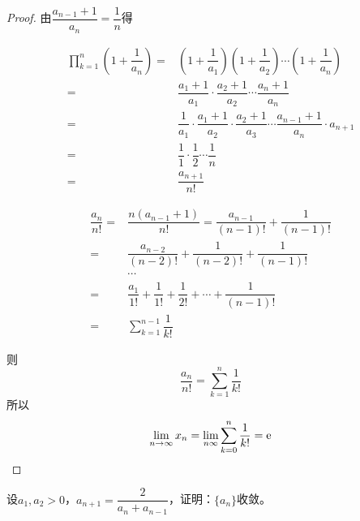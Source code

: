 \begin{proof}

    由$\dfrac{a_{n - 1} + 1}{a_n} = \dfrac{1}{n}$得

    \begin{align*}
        \prod_{k  = 1}^{n}{\left( 1 + \dfrac{1}{a_n} \right)} = & \left( 1 + \dfrac{1}{a_1} \right) \left( 1 + \dfrac{1}{a_2} \right) \cdots \left( 1 + \dfrac{1}{a_n} \right) \\
        = & \dfrac{a_1 + 1}{a_1} \cdot \dfrac{a_2 + 1}{a_2} \cdots \dfrac{a_n + 1}{a_n} \\
        = & \dfrac{1}{a_1} \cdot \dfrac{a_1 + 1}{a_2} \cdot \dfrac{a_2 + 1}{a_3} \cdots \dfrac{a_{n - 1} + 1}{a_n} \cdot a_{n + 1} \\
        = & \dfrac{1}{1} \cdot \dfrac{1}{2} \cdots \dfrac{1}{n} \\
        = & \dfrac{a_{n + 1}}{n!} 
    \end{align*}

    \begin{align*}
        \dfrac{a_n}{n!} = & \dfrac{n(a_{n - 1} + 1)}{n!} = \dfrac{a_{n - 1}}{(n - 1)!} + \dfrac{1}{(n - 1)!} \\
        = & \dfrac{a_{n - 2}}{(n - 2)!} + \dfrac{1}{(n - 2)!} + \dfrac{1}{(n - 1)!} \\
        & \cdots \\ 
        = & \dfrac{a_1}{1!} + \dfrac{1}{1!} + \dfrac{1}{2!} + \cdots + \dfrac{1}{(n - 1)!} \\
        = & \sum\limits_{k  = 1}^{n - 1}{\dfrac{1}{k!}} 
    \end{align*}

    则
    $$\dfrac{a_n}{n!} = \sum\limits_{k  = 1}^{n}{\dfrac{1}{k!}}$$
    所以
    $$\lim\limits_{n \to \infty}{x_n} = \lim\limits_{n\infty}{\sum\limits_{k = 0}^{n}{\dfrac{1}{k!}}} = \mathrm{e}$$

\end{proof}

\begin{proposition}

    设$a_1,a_2>0$，$a_{n + 1} = \dfrac{2}{a_n + a_{n - 1}}$，证明：$\{a_n\}$收敛。

\end{proposition}

